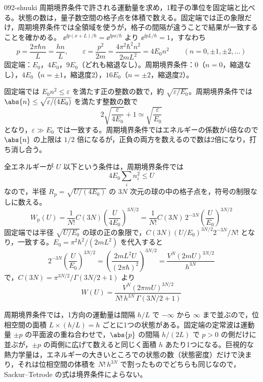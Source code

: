 \documentclass[uplatex,dvipdfmx,a4paper,11pt]{jsarticle}
\begin{document}
\begin{kaisetsu}{092-shuuki}
\houshin 周期境界条件で許される運動量を求め，1粒子の準位を固定端と比べる。状態の数は，量子数空間の格子点を体積で数える。固定端では正の象限だけ，周期境界条件では全領域を使うが，格子の間隔が違うことで結果が一致することを確かめる。
\keisan {} $\ee^{\ii p(x+L)/\hbar}=\ee^{\ii px/\hbar}$ より $\ee^{\ii pL/\hbar}=1$，すなわち
\[ p=\frac{2\pi\hbar n}{L}=\frac{hn}{L},\qquad\varepsilon=\frac{p^{2}}{2m}=\frac{4\pi^{2}\hbar^{2}n^{2}}{2mL^{2}}=4E_{0}n^{2}\qquad(n=0,\pm1,\pm2,\dots) \]
固定端：$E_{0}$，$4E_{0}$，$9E_{0}$（どれも縮退なし）。周期境界条件：$0$（$n=0$，縮退なし），$4E_{0}$（$n=\pm1$，縮退度2），$16E_{0}$（$n=\pm2$，縮退度2）。

 固定端では $E_{0}n^{2}\le\varepsilon$ を満たす正の整数の数で，約 $\sqrt{\varepsilon/E_{0}}$。周期境界条件では $\abs{n}\le\sqrt{\varepsilon/(4E_{0})}$ を満たす整数の数で
\[ 2\sqrt{\frac{\varepsilon}{4E_{0}}}+1\simeq\sqrt{\frac{\varepsilon}{E_{0}}} \]
となり，$\varepsilon\gg E_{0}$ では一致する。周期境界条件ではエネルギーの係数が4倍なので $\abs{n}$ の上限は $1/2$ 倍になるが，正負の両方を数えるので数は2倍になり，打ち消し合う。

 全エネルギーが $U$ 以下という条件は，周期境界条件では
\[ 4E_{0}\sum_{i}n_{i}^{2}\le U \]
なので，半径 $R_{\mathrm{p}}=\sqrt{U/(4E_{0})}$ の $3N$ 次元の球の中の格子点を，符号の制限なしに数える。
\[ W_{\mathrm{p}}(U)=\frac{1}{N!}C(3N)\left(\frac{U}{4E_{0}}\right)^{3N/2}=\frac{1}{N!}C(3N)\,2^{-3N}\left(\frac{U}{E_{0}}\right)^{3N/2} \]
固定端では半径 $\sqrt{U/E_{0}}$ の球の正の象限で，$C(3N)(U/E_{0})^{3N/2}2^{-3N}/N!$ となり，一致する。$E_{0}=\pi^{2}\hbar^{2}/(2mL^{2})$ を代入すると
\[ 2^{-3N}\left(\frac{U}{E_{0}}\right)^{3N/2}=\left(\frac{2mL^{2}U}{(2\pi\hbar)^{2}}\right)^{3N/2}=\frac{V^{N}(2mU)^{3N/2}}{h^{3N}} \]
で，$C(3N)=\pi^{3N/2}/\Gamma(3N/2+1)$ より
\[ W(U)=\frac{V^{N}(2\pi mU)^{3N/2}}{N!\,h^{3N}\,\Gamma(3N/2+1)} \]

 周期境界条件では，1方向の運動量は間隔 $h/L$ で $-\infty$ から $\infty$ まで並ぶので，位相空間の面積 $L\times(h/L)=h$ ごとに1つの状態がある。固定端の定常波は運動量 $\pm p$ の平面波の重ね合わせで，$\abs{p}$ の間隔 $h/(2L)$ で $p>0$ の側だけに並ぶが，$\pm p$ の両側に広げて数えると同じく面積 $h$ あたり1つになる。巨視的な熱力学量は，エネルギーの大きいところでの状態の数（状態密度）だけで決まり，それは位相空間の体積を $N!\,h^{3N}$ で割ったものでどちらも同じなので，Sackur--Tetrode の式は境界条件によらない。


\end{kaisetsu}
\end{document}
